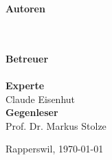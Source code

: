 \begin{titlepage}
	\begin{minipage}{\linewidth}
	
	\end{minipage}
	\begin{minipage}{\linewidth}
	\begin{minipage}[t]{0.33\linewidth}
		\Large \textbf{Autoren} \\
		\Large \rlif \\
		\Large \chuf \\
		\Large \fscf
	\end{minipage}
	\hfill\begin{minipage}[t]{0.5\linewidth}
		\Large \textbf{Betreuer} \\
		\Large \proff \\
		\textbf{\Large Experte}\\
		\Large Claude Eisenhut \\
		\textbf{\Large Gegenleser}\\
		\Large Prof. Dr. Markus Stolze
	\end{minipage}
	\end{minipage}
		
	\begin{minipage}{0.33\linewidth}	
		
	\end{minipage}
	\begin{minipage}{0.33\linewidth}
		
		
	\end{minipage}
	\begin{minipage}{0.33\linewidth}
	
	\end{minipage}
	\vfill
	\Large Rapperswil, \today

\end{titlepage}

\restoregeometry
